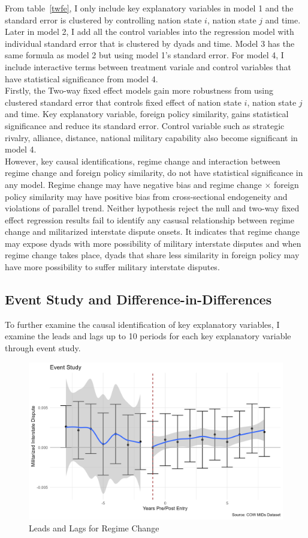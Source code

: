\documentclass[12pt,a4paper]{article}
\begin{document}
From table~\ref{twfe}, I only include key explanatory variables in model 1 and the standard error is clustered by controlling nation state $i$, nation state $j$ and time. Later in model 2, I add all the control variables into the regression model with individual standard error that is clustered by dyads and time. Model 3 has the same formula as model 2 but using model 1's standard error. For model 4, I include interactive terms between treatment variale and control variables that have statistical significance from model 4. 
\\Firstly, the Two-way fixed effect models gain more robustness from using clustered standard error that controls fixed effect of nation state $i$, nation state $j$ and time. Key explanatory variable, foreign policy similarity, gains statistical significance and reduce its standard error. Control variable such as strategic rivalry, alliance, distance, national military capability also become significant in model 4.
\\However, key causal identifications, regime change and interaction between regime change and foreign policy similarity, do not have statistical significance in any model. Regime change may have negative bias and regime change $\times$ foreign policy similarity may have positive bias from cross-sectional endogeneity and violations of parallel trend. Neither hypothesis reject the null and two-way fixed effect regression results fail to identify any casusal relationship between regime change and militarized interstate dispute onsets. It indicates that regime change may expose dyads with more possibility of military interstate disputes and when regime change takes place, dyads that share less similarity in foreign policy may have more possibility to suffer military interstate disputes.

\subsection{Event Study and Difference-in-Differences}
To further examine the causal identification of key explanatory variables, I examine the leads and lags up to 10 periods for each key explanatory variable through event study.

\begin{figure}[!hptb]
\centering
\includegraphics[width=1\linewidth]{leadslags.png}
\caption{\label{fig:leadslags}Leads and Lags for Regime Change}
\end{figure}
\end{document}
